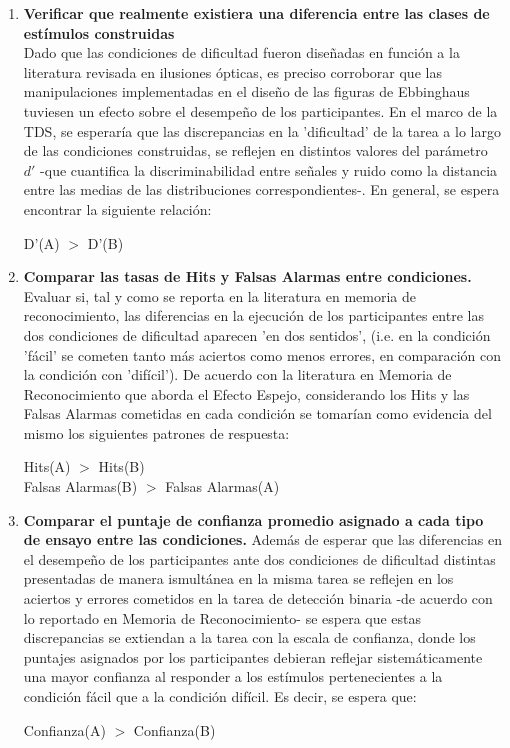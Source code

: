 \begin{enumerate}
\item \textbf{Verificar que realmente existiera una diferencia entre las clases de estímulos construidas}\\

Dado que las condiciones de dificultad fueron diseñadas en función a la literatura revisada en ilusiones ópticas, es preciso corroborar que las manipulaciones implementadas en el diseño de las figuras de Ebbinghaus tuviesen un efecto sobre el desempeño de los participantes. En el marco de la TDS, se esperaría que las discrepancias en la 'dificultad' de la tarea a lo largo de las condiciones construidas, se reflejen en distintos valores del parámetro $d'$ -que cuantifica la discriminabilidad entre señales y ruido como la distancia entre las medias de las distribuciones correspondientes-. En general, se espera encontrar la siguiente relación:\\

\begin{center}
 D'(A) $>$ D'(B)\\
 \end{center}

 \item \textbf{Comparar las tasas de Hits y Falsas Alarmas entre condiciones.}
Evaluar si, tal y como se reporta en la literatura en memoria de reconocimiento, las diferencias en la ejecución de los participantes entre las dos condiciones de dificultad aparecen 'en dos sentidos', (i.e. en la condición 'fácil' se cometen tanto más aciertos como menos errores, en comparación con la condición con 'difícil'). De acuerdo con la literatura en Memoria de Reconocimiento que aborda el Efecto Espejo, considerando los Hits y las Falsas Alarmas cometidas en cada condición se tomarían como evidencia del mismo los siguientes patrones de respuesta:
\begin{center}
Hits(A) $>$ Hits(B)\\
Falsas Alarmas(B) $>$ Falsas Alarmas(A)\\
\end{center}

\item \textbf{Comparar el puntaje de confianza promedio asignado a cada tipo de ensayo entre las condiciones.}
Además de esperar que las diferencias en el desempeño de los participantes ante dos condiciones de dificultad distintas presentadas de manera ismultánea en la misma tarea se reflejen en los aciertos y errores cometidos en la tarea de detección binaria -de acuerdo con lo reportado en Memoria de Reconocimiento- se espera que estas discrepancias se extiendan a la tarea con la escala de confianza, donde los puntajes asignados por los participantes debieran reflejar sistemáticamente una mayor confianza al responder a los estímulos pertenecientes a la condición fácil que a la condición difícil. Es decir, se espera que:
\begin{center}
Confianza(A) $>$ Confianza(B)\\
\end{center}


\end{enumerate}
